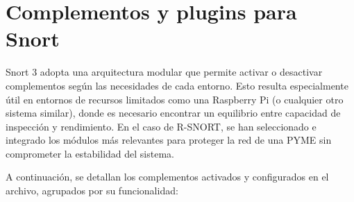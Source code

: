 \documentclass[12pt,a4paper]{report}
\begin{document}
\pagebreak

\section{Complementos y plugins para Snort}

Snort 3 adopta una arquitectura modular que permite activar o desactivar complementos según las necesidades de cada entorno. Esto resulta especialmente útil en entornos de recursos limitados como una Raspberry Pi (o cualquier otro sistema similar), donde es necesario encontrar un equilibrio entre capacidad de inspección y rendimiento. En el caso de R-SNORT, se han seleccionado e integrado los módulos más relevantes para proteger la red de una PYME sin comprometer la estabilidad del sistema.

A continuación, se detallan los complementos activados y configurados en el archivo, agrupados por su funcionalidad:
\end{document}
